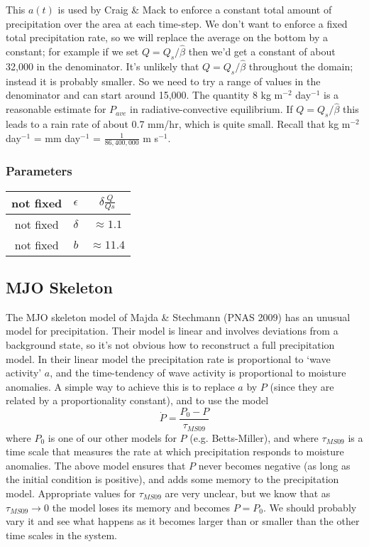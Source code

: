 \documentclass[10pt]{article}
\begin{document}
This $a(t)$ is used by Craig \& Mack to enforce a constant total amount of precipitation over the area at each time-step.
We don't want to enforce a fixed total precipitation rate, so we will replace the average on the bottom by a constant; for example if we set $Q=Q_s/\hat{\beta}$ then we'd get a constant of about 32,000 in the denominator.
It's unlikely that $Q = Q_s/\hat{\beta}$ throughout the domain; instead it is probably smaller.
So we need to try a range of values in the denominator and can start around 15,000.
The quantity $8$ kg m$^{-2}$ day$^{-1}$ is a reasonable estimate for $P_{ave}$ in radiative-convective equilibrium.
If $Q=Q_s/\hat{\beta}$ this leads to a rain rate of about 0.7 mm/hr, which is quite small.
Recall that kg m$^{-2}$ day$^{-1}$ = mm day$^{-1}$ = $\frac{1}{86,400,000}$ m s$^{-1}$. 
\subsubsection{Parameters}
\begin{center}
	\begin{tabular}{||c |c|c|| } 
		\hline
		not fixed & $\epsilon$ &   $\delta \frac{Q}{Qs}$ \\ \hline
		not fixed & $\delta$ & $ \approx 1.1$  \\ \hline
		not fixed & $b$& $ \approx 11.4$\\ \hline
	\end{tabular}
\end{center}

\subsection{MJO Skeleton}
The MJO skeleton model of Majda \& Stechmann (PNAS 2009) has an unusual model for precipitation.
Their model is linear and involves deviations from a background state, so it's not obvious how to reconstruct a full precipitation model.
In their linear model the precipitation rate is proportional to `wave activity' $a$, and the time-tendency of wave activity is proportional to moisture anomalies.
A simple way to achieve this is to replace $a$ by $P$ (since they are related by a proportionality constant), and to use the model
\[\dot{P} = \frac{P_0-P}{\tau_{MS09}}\]
where $P_0$ is one of our other models for $P$ (e.g. Betts-Miller), and
where $\tau_{MS09}$ is a time scale that measures the rate at which precipitation responds to moisture anomalies.
The above model ensures that $P$ never becomes negative (as long as the initial condition is positive), and adds some memory to the precipitation model.
Appropriate values for $\tau_{MS09}$ are very unclear, but we know that as $\tau_{MS09}\to0$ the model loses its memory and becomes $P=P_0$.
We should probably vary it and see what happens as it becomes larger than or smaller than the other time scales in the system.
\end{document}
